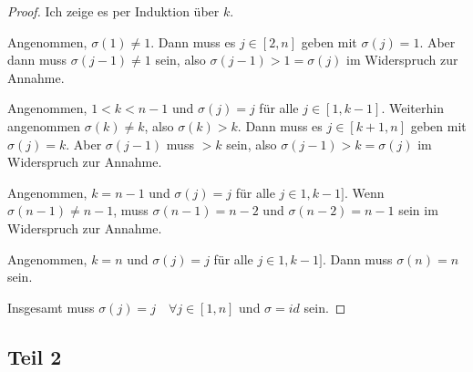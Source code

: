 \documentclass[10pt,a4paper]{article}
\begin{document}
\begin{proof}
Ich zeige es per Induktion über $k$.

Angenommen, $\sigma(1) \ne 1$.
Dann muss es $j \in [2, n]$ geben mit $\sigma(j) = 1$.
Aber dann muss $\sigma(j - 1) \ne 1$ sein, also $\sigma(j - 1) > 1 = \sigma(j)$ im Widerspruch zur Annahme.

Angenommen, $1 < k < n - 1$ und $\sigma(j) = j$ für alle $j \in [1, k - 1]$.
Weiterhin angenommen $\sigma(k) \ne k$, also $\sigma(k) > k$.
Dann muss es $j \in [k + 1, n]$ geben mit $\sigma(j) = k$.
Aber $\sigma(j - 1)$ muss $> k$ sein, also $\sigma(j - 1) > k = \sigma(j)$ im Widerspruch zur Annahme.

Angenommen, $k = n - 1$ und $\sigma(j) = j$ für alle $j \in 1, k - 1]$.
Wenn $\sigma(n - 1) \ne n - 1$, muss $\sigma(n - 1) = n - 2$ und $\sigma(n - 2) = n - 1$ sein im Widerspruch zur Annahme.

Angenommen, $k = n$ und $\sigma(j) = j$ für alle $j \in 1, k - 1]$.
Dann muss $\sigma(n) = n$ sein.

Insgesamt muss $\sigma(j) = j \quad \forall j \in [1, n]$ und $\sigma = id$ sein.
\end{proof}

\subsection*{Teil 2}
\end{document}
